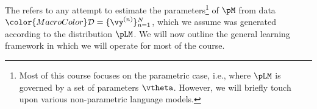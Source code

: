 \newcommand{\paramspace}{{\color{MacroColor}\Theta}}
\newcommand{\modelparams}{{\color{MacroColor}\vtheta}}
\newcommand{\model}{{\color{MacroColor}\pM^\vtheta}}
\newcommand{\loglike}{{\color{MacroColor}\mathcal{L}}}
\newcommand{\vthetamle}{{\color{MacroColor}\modelparams{\mathrm{MLE}}}}
\newcommand{\corpus}{{\color{MacroColor}\mathcal{D}}}
\newcommand{\corpustrain}{{\color{MacroColor}\mathcal{D}_{\scaleto{\text{train}}{4pt}}}}
\newcommand{\corpustest}{{\color{MacroColor}\mathcal{D}_{\scaleto{\text{test}}{4pt}}}}
\newcommand{\corpusval}{{\color{MacroColor}\mathcal{D}_{\scaleto{\text{val}}{4pt}}}}
\newcommand{\calX}{{\color{MacroColor}\mathcal{X}}}
\newcommand{\ent}{{\color{MacroColor}\mathrm{H}}}
\newcommand{\objective}{{\color{MacroColor}O}}
\newcommand{\loss}{{\color{MacroColor}\ell}}



The  refers to any attempt to estimate the parameters\footnote{Most of this course focuses on the parametric case, i.e., where $\pLM$ is governed by a set of parameters $\vtheta$. 
However, we will briefly touch upon various non-parametric language models.} of $\pM$ from data $\corpus = \{ \vy^{(n)}\}_{n=1}^{N}$, which we assume was generated according to the distribution $\pLM$. 
We will now outline the general learning framework in which we will operate for most of the course.


